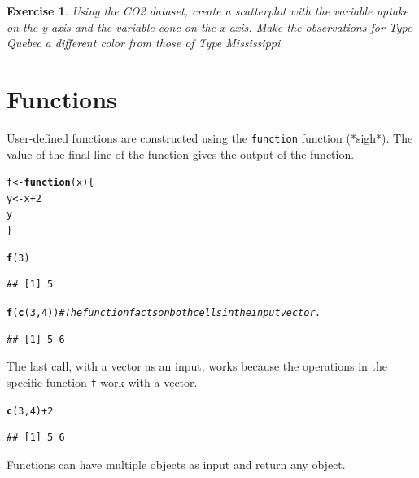 \documentclass{article}\usepackage[]{graphicx}\usepackage[]{color}
\makeatletter
\newcommand{\hlnum}[1]{\textcolor[rgb]{0.686,0.059,0.569}{#1}}%
\newcommand{\hlcom}[1]{\textcolor[rgb]{0.678,0.584,0.686}{\textit{#1}}}%
\newcommand{\hlopt}[1]{\textcolor[rgb]{0,0,0}{#1}}%
\newcommand{\hlstd}[1]{\textcolor[rgb]{0.345,0.345,0.345}{#1}}%
\newcommand{\hlkwa}[1]{\textcolor[rgb]{0.161,0.373,0.58}{\textbf{#1}}}%
\newcommand{\hlkwb}[1]{\textcolor[rgb]{0.69,0.353,0.396}{#1}}%
\newcommand{\hlkwc}[1]{\textcolor[rgb]{0.333,0.667,0.333}{#1}}%
\newcommand{\hlkwd}[1]{\textcolor[rgb]{0.737,0.353,0.396}{\textbf{#1}}}%
\newenvironment{kframe}{%
 \def\at@end@of@kframe{}%
 \ifinner\ifhmode%
  \def\at@end@of@kframe{\end{minipage}}%
  \begin{minipage}{\columnwidth}%
 \fi\fi%
 \def\FrameCommand##1{\hskip\@totalleftmargin \hskip-\fboxsep
 \colorbox{shadecolor}{##1}\hskip-\fboxsep
     \hskip-\linewidth \hskip-\@totalleftmargin \hskip\columnwidth}%
 \MakeFramed {\advance\hsize-\width
   \@totalleftmargin\z@ \linewidth\hsize
   \@setminipage}}%
 {\par\unskip\endMakeFramed%
 \at@end@of@kframe}
\newenvironment{knitrout}{}{} %
\newtheorem{exercise}{Exercise}[section]
\makeatother
\begin{document}
\begin{exercise}
Using the CO2 dataset, create a scatterplot with the variable uptake on the y axis and the variable conc on the x axis. Make the observations for Type Quebec a different color from those of Type Mississippi.
\end{exercise}

\section{Functions}
User-defined functions are constructed using the \texttt{function} function (*sigh*). The value of the final line of the function gives the output of the function.
\begin{knitrout}
\color{fgcolor}\begin{kframe}
\begin{alltt}
\hlstd{f} \hlkwb{<-} \hlkwa{function}\hlstd{(}\hlkwc{x}\hlstd{)\{}
  \hlstd{y} \hlkwb{<-} \hlstd{x} \hlopt{+} \hlnum{2}
  \hlstd{y}
\hlstd{\}}

\hlkwd{f}\hlstd{(}\hlnum{3}\hlstd{)}
\end{alltt}
\begin{verbatim}
## [1] 5
\end{verbatim}
\begin{alltt}
\hlkwd{f}\hlstd{(}\hlkwd{c}\hlstd{(}\hlnum{3}\hlstd{,} \hlnum{4}\hlstd{))} \hlcom{#The function f acts on both cells in the input vector.}
\end{alltt}
\begin{verbatim}
## [1] 5 6
\end{verbatim}
\end{kframe}
\end{knitrout}
The last call, with a vector as an input, works because the operations in the specific function \texttt{f} work with a vector.
\begin{knitrout}
\color{fgcolor}\begin{kframe}
\begin{alltt}
\hlkwd{c}\hlstd{(}\hlnum{3}\hlstd{,} \hlnum{4}\hlstd{)} \hlopt{+} \hlnum{2}
\end{alltt}
\begin{verbatim}
## [1] 5 6
\end{verbatim}
\end{kframe}
\end{knitrout}
Functions can have multiple objects as input and return any object.
\end{document}
